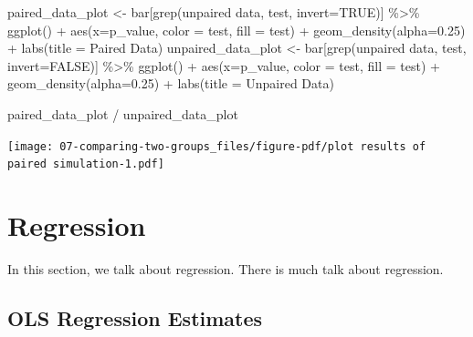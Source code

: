 \documentclass[
  letterpaper,
  DIV=11,
  numbers=noendperiod]{scrreprt}
\newenvironment{Shaded}{\begin{snugshade}}{\end{snugshade}}
\newcommand{\AttributeTok}[1]{\textcolor[rgb]{0.40,0.45,0.13}{#1}}
\newcommand{\ConstantTok}[1]{\textcolor[rgb]{0.56,0.35,0.01}{#1}}
\newcommand{\FloatTok}[1]{\textcolor[rgb]{0.68,0.00,0.00}{#1}}
\newcommand{\FunctionTok}[1]{\textcolor[rgb]{0.28,0.35,0.67}{#1}}
\newcommand{\NormalTok}[1]{\textcolor[rgb]{0.00,0.23,0.31}{#1}}
\newcommand{\OtherTok}[1]{\textcolor[rgb]{0.00,0.23,0.31}{#1}}
\newcommand{\SpecialCharTok}[1]{\textcolor[rgb]{0.37,0.37,0.37}{#1}}
\newcommand{\StringTok}[1]{\textcolor[rgb]{0.13,0.47,0.30}{#1}}
\begin{document}
\begin{Shaded}
\begin{Highlighting}[]
\NormalTok{paired\_data\_plot }\OtherTok{\textless{}{-}}\NormalTok{ bar[}\FunctionTok{grep}\NormalTok{(}\StringTok{\textquotesingle{}unpaired data\textquotesingle{}}\NormalTok{, test, }\AttributeTok{invert=}\ConstantTok{TRUE}\NormalTok{)] }\SpecialCharTok{\%\textgreater{}\%} 
  \FunctionTok{ggplot}\NormalTok{() }\SpecialCharTok{+} 
    \FunctionTok{aes}\NormalTok{(}\AttributeTok{x=}\NormalTok{p\_value, }\AttributeTok{color =}\NormalTok{ test, }\AttributeTok{fill =}\NormalTok{ test) }\SpecialCharTok{+} 
    \FunctionTok{geom\_density}\NormalTok{(}\AttributeTok{alpha=}\FloatTok{0.25}\NormalTok{) }\SpecialCharTok{+} 
  \FunctionTok{labs}\NormalTok{(}\AttributeTok{title =} \StringTok{\textquotesingle{}Paired Data\textquotesingle{}}\NormalTok{)}
\NormalTok{unpaired\_data\_plot }\OtherTok{\textless{}{-}}\NormalTok{ bar[}\FunctionTok{grep}\NormalTok{(}\StringTok{\textquotesingle{}unpaired data\textquotesingle{}}\NormalTok{, test, }\AttributeTok{invert=}\ConstantTok{FALSE}\NormalTok{)] }\SpecialCharTok{\%\textgreater{}\%} 
  \FunctionTok{ggplot}\NormalTok{() }\SpecialCharTok{+} 
    \FunctionTok{aes}\NormalTok{(}\AttributeTok{x=}\NormalTok{p\_value, }\AttributeTok{color =}\NormalTok{ test, }\AttributeTok{fill =}\NormalTok{ test) }\SpecialCharTok{+} 
    \FunctionTok{geom\_density}\NormalTok{(}\AttributeTok{alpha=}\FloatTok{0.25}\NormalTok{) }\SpecialCharTok{+} 
  \FunctionTok{labs}\NormalTok{(}\AttributeTok{title =} \StringTok{\textquotesingle{}Unpaired Data\textquotesingle{}}\NormalTok{)}

\NormalTok{paired\_data\_plot }\SpecialCharTok{/}\NormalTok{ unpaired\_data\_plot}
\end{Highlighting}
\end{Shaded}

\texttt{[image: 07-comparing-two-groups\_files/figure-pdf/plot results of paired simulation-1.pdf]}

\part{Regression}

In this section, we talk about regression. There is much talk about
regression.

\chapter{OLS Regression Estimates}\label{ols-regression-estimates}
\end{document}
